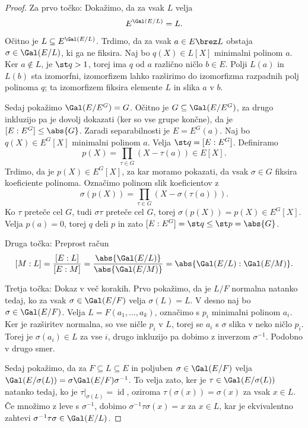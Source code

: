 \begin{proof}
  Za prvo točko:
  Dokažimo, da za vsak $L$ velja
  \[
	E^{\Gal(E/L)} = L.
  \]
  Očitno je $L \subseteq E^{\Gal(E/L)}$.
  Trdimo, da za vsak $a \in E \brez L$ obstaja $\sigma \in \Gal(E/L)$, ki ga ne
  fiksira.
  Naj bo $q(X) \in L[X]$ minimalni polinom $a$.
  Ker $a \notin L$, je $\st q > 1$, torej ima $q$ od $a$ različno ničlo $b \in
  E$.
  Polji $L(a)$ in $L(b)$ sta izomorfni, izomorfizem lahko razširimo do
  izomorfizma razpadnih polj polinoma $q$; ta izomorfizem fiksira elemente $L$
  in slika $a$ v $b$.

  Sedaj pokažimo $\Gal(E/E^G) = G$.
  Očitno je $G \subseteq \Gal(E/E^G)$, za drugo inkluzijo pa je dovolj dokazati
  (ker so vse grupe končne), da je $[E:E^G] \le \abs{G}$.
  Zaradi separabilnosti je $E = E^G(a)$.
  Naj bo $q(X) \in E^G[X]$ minimalni polinom $a$.
  Velja $\st q = [E:E^G]$.
  Definiramo
  \[
	p(X) = \prod_{\tau \in G} (X - \tau(a)) \in E[X].
  \]
  Trdimo, da je $p(X) \in E^G[X]$, za kar moramo pokazati, da vsak $\sigma \in
  G$ fiksira koeficiente polinoma.
  Označimo polinom slik koeficientov z
  \[
	\sigma(p(X)) = \prod_{\tau \in G} (X - \sigma(\tau(a))).
  \]
  Ko $\tau$ preteče cel $G$, tudi $\sigma \tau$ preteče cel $G$, torej
  $\sigma(p(X)) = p(X) \in E^G[X]$.
  Velja $p(a) = 0$, torej $q$ deli $p$ in zato $[E:E^G] = \st q \le \st p =
  \abs{G}$.

  Druga točka:
  Preprost račun
  \[
	[M:L]
	= \frac{[E:L]}{[E:M]} = \frac{\abs{\Gal(E/L)}}{\abs{\Gal(E/M)}}
	= \abs{\Gal(E/L) : \Gal(E/M)}.
  \]

  Tretja točka:
  Dokaz v več korakih.
  Prvo pokažimo, da je $L/F$ normalna natanko tedaj, ko za vsak $\sigma \in
  \Gal(E/F)$ velja $\sigma(L) = L$.
  V desno naj bo $\sigma \in \Gal(E/F)$.
  Velja $L = F(a_1, \ldots, a_k)$, označimo s $p_i$ minimalni polinom $a_i$.
  Ker je razširitev normalna, so vse ničle $p_i$ v $L$, torej se $a_i$ s
  $\sigma$ slika v neko ničlo $p_i$.
  Torej je $\sigma(a_i) \in L$ za vse $i$, drugo inkluzijo pa dobimo z inverzom
  $\sigma^{-1}$.
  Podobno v drugo smer.

  Sedaj pokažimo, da za $F \subseteq L \subseteq E$ in poljuben $\sigma \in
  \Gal(E/F)$ velja $\Gal(E/\sigma(L)) = \sigma \Gal(E/F) \sigma^{-1}$.
  To velja zato, ker je $\tau \in \Gal(E/\sigma(L))$ natanko tedaj, ko je
  $\left. \tau \right|_{\sigma(L)} = \operatorname{id}$, oziroma
  $\tau(\sigma(x)) = \sigma(x)$ za vsak $x \in L$.
  Če množimo z leve s $\sigma^{-1}$, dobimo $\sigma^{-1} \tau \sigma (x) = x$ za
  $x \in L$, kar je ekvivalentno zahtevi $\sigma^{-1} \tau \sigma \in \Gal(E/L)$.


\end{proof}
